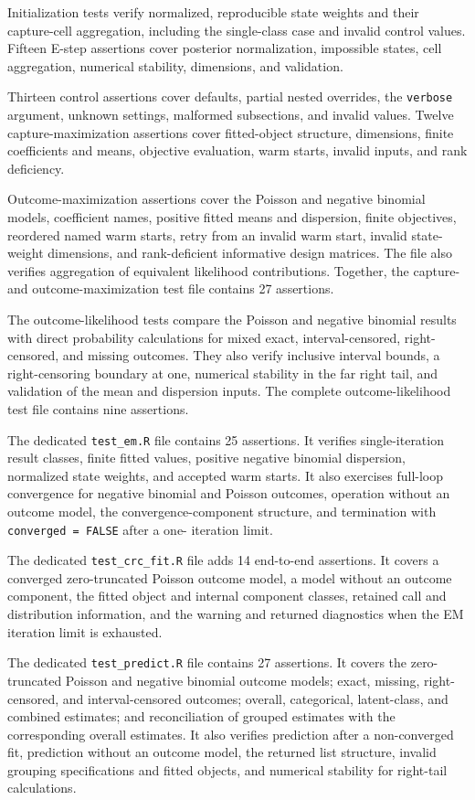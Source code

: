 \documentclass[11pt,letterpaper]{article}
\begin{document}
Initialization tests verify normalized, reproducible state weights and their
capture-cell aggregation, including the single-class case and invalid control
values. Fifteen E-step assertions cover posterior normalization, impossible
states, cell aggregation, numerical stability, dimensions, and validation.

Thirteen control assertions cover defaults, partial nested overrides, the
\texttt{verbose} argument, unknown settings, malformed subsections, and
invalid values. Twelve capture-maximization assertions cover fitted-object
structure, dimensions, finite coefficients and means, objective evaluation,
warm starts, invalid inputs, and rank deficiency.

Outcome-maximization assertions cover the Poisson and negative
binomial models, coefficient names, positive fitted means and dispersion,
finite objectives, reordered named warm starts, retry from an invalid warm
start, invalid state-weight dimensions, and rank-deficient informative design
matrices. The file also verifies aggregation of equivalent likelihood
contributions. Together, the capture- and outcome-maximization test file
contains 27 assertions.

The outcome-likelihood tests compare the Poisson and negative binomial results
with direct probability calculations for mixed exact, interval-censored,
right-censored, and missing outcomes. They also verify inclusive interval
bounds, a right-censoring boundary at one, numerical stability in the far
right tail, and validation of the mean and dispersion inputs. The complete
outcome-likelihood test file contains nine assertions.

The dedicated \texttt{test\_em.R} file contains 25 assertions. It verifies
single-iteration result classes, finite fitted values, positive negative
binomial dispersion, normalized state weights, and accepted warm starts. It
also exercises full-loop convergence for negative binomial and Poisson
outcomes, operation without an outcome model, the convergence-component
structure, and termination with \texttt{converged = FALSE} after a one-
iteration limit.

The dedicated \texttt{test\_crc\_fit.R} file adds 14 end-to-end assertions.
It covers a converged zero-truncated Poisson outcome model, a model without an
outcome component, the fitted object and internal component classes, retained
call and distribution information, and the warning and returned diagnostics
when the EM iteration limit is exhausted.

The dedicated \texttt{test\_predict.R} file contains 27 assertions. It covers
the zero-truncated Poisson and negative binomial outcome models; exact, missing,
right-censored, and interval-censored outcomes; overall, categorical,
latent-class, and combined estimates; and reconciliation of grouped estimates
with the corresponding overall estimates. It also verifies prediction after a
non-converged fit, prediction without an outcome model, the returned list
structure, invalid grouping specifications and fitted objects, and numerical
stability for right-tail calculations.
\end{document}
